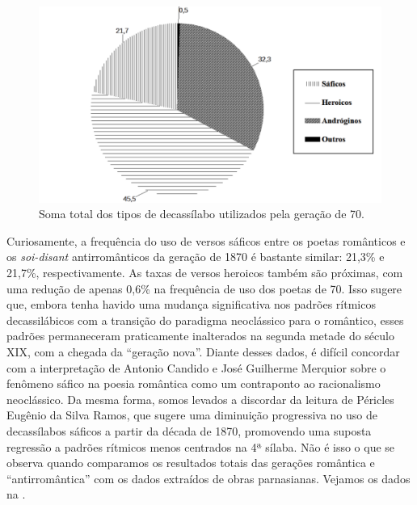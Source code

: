 \documentclass[portuguese]{textolivre}
\begin{document}
\begin{figure}[!h]
    \centering
    \begin{minipage}{0.75\linewidth}
    \includegraphics[width=\linewidth]{fig-004.pdf}
    \caption{Soma total dos tipos de decassílabo utilizados pela geração de 70.}
    \label{fig4}
    \end{minipage}
\end{figure}

Curiosamente, a frequência do uso de versos sáficos entre os poetas românticos e os \textit{soi-disant} antirromânticos da geração de 1870 é bastante similar: 21,3\% e 21,7\%, respectivamente. As taxas de versos heroicos também são próximas, com uma redução de apenas 0,6\% na frequência de uso dos poetas de 70. Isso sugere que, embora tenha havido uma mudança significativa nos padrões rítmicos decassilábicos com a transição do paradigma neoclássico para o romântico, esses padrões permaneceram praticamente inalterados na segunda metade do século XIX, com a chegada da “geração nova”. Diante desses dados, é difícil concordar com a interpretação de Antonio Candido e José Guilherme Merquior sobre o fenômeno sáfico na poesia romântica como um contraponto ao racionalismo neoclássico. Da mesma forma, somos levados a discordar da leitura de Péricles Eugênio da Silva Ramos, que sugere uma diminuição progressiva no uso de decassílabos sáficos a partir da década de 1870, promovendo uma suposta regressão a padrões rítmicos menos centrados na 4ª sílaba. Não é isso o que se observa quando comparamos os resultados totais das gerações romântica e “antirromântica” com os dados extraídos de obras parnasianas. Vejamos os dados na .
\end{document}
